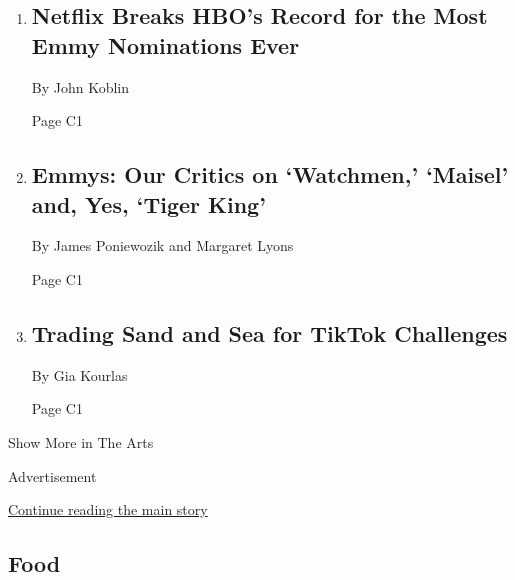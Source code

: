 \begin{enumerate}
\def\labelenumi{\arabic{enumi}.}
\item
  \href{/2020/07/28/arts/television/emmy-nominations.html}{}

  \hypertarget{netflix-breaks-hbos-record-for-the-most-emmy-nominations-ever-1}{%
  \subsection{Netflix Breaks HBO's Record for the Most Emmy Nominations
  Ever}\label{netflix-breaks-hbos-record-for-the-most-emmy-nominations-ever-1}}

  By John Koblin

  Page C1
\item
  \href{/2020/07/28/arts/television/emmys-watchmen-handmaids-tale-tiger-king.html}{}

  \hypertarget{emmys-our-critics-on-watchmen-maisel-and-yes-tiger-king}{%
  \subsection{Emmys: Our Critics on `Watchmen,' `Maisel' and, Yes,
  `Tiger
  King'}\label{emmys-our-critics-on-watchmen-maisel-and-yes-tiger-king}}

  By James Poniewozik and Margaret Lyons

  Page C1
\item
  \href{/2020/07/28/arts/dance/beach-sessions-rockaway-tiktok.html}{}

  \hypertarget{trading-sand-and-sea-for-tiktok-challenges}{%
  \subsection{Trading Sand and Sea for TikTok
  Challenges}\label{trading-sand-and-sea-for-tiktok-challenges}}

  By Gia Kourlas

  Page C1
\end{enumerate}

Show More in The Arts

Advertisement

\protect\hyperlink{after-mid5}{Continue reading the main story}

\hypertarget{food}{%
\subsection{Food}\label{food}}

